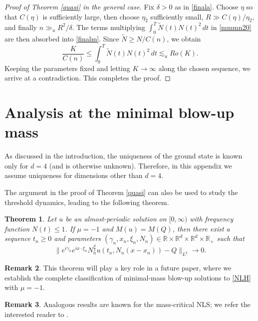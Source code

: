 \documentclass[reqno,11pt]{amsart}
\theoremstyle{plain}
\newtheorem{theorem}{Theorem}
\theoremstyle{definition}
\newtheorem{remark}[theorem]{Remark}
\numberwithin{equation}{section}
\numberwithin{theorem}{section}
\def\geq{\geqslant}
\def\leq{\leqslant}
\begin{document}
\begin{proof}[Proof of Theorem \ref{quasi} in the general case]
Fix $\delta>0$ as in \eqref{finala}. Choose $\eta$ so that $C(\eta)$ is
sufficiently large, then choose $\eta_2$ sufficiently small,
$R\gg C(\eta)/\eta_2$, and finally $n\gg_u R^2/\delta$.
The terms multiplying $\int_0^T\tilde N(t)N(t)^2\,dt$ in \eqref{mmmn20}
are then absorbed into \eqref{finalm}. Since $\tilde N\geq N/C(n)$, we obtain
\begin{equation}\label{finaln}
 \frac{K}{C(n)}\leq\int_0^T\tilde N(t)N(t)^2\,dt
                    \lesssim_u Ro(K).
\end{equation}
Keeping the parameters fixed and letting $K\to\infty$ along the chosen
sequence, we arrive at a contradiction. This completes the proof.
\end{proof}

\appendix 

\section{Analysis at the minimal blow-up mass}\label{app}

As discussed in the introduction, the uniqueness of the ground state is known only for $d=4$ (and is otherwise unknown). 
Therefore, in this appendix we assume uniqueness for dimensions other than $d=4$.

The argument in the proof of Theorem \ref{quasi} can also be used to study the threshold dynamics, 
leading to the following theorem.

\begin{theorem}
Let $u$ be an almost-periodic solution on $[0,\infty)$  with frequency function $N(t)\leq 1$. 
If $\mu=-1$ and $M(u)=M(Q)$, then there exist a sequence $t_n\geq 0$ and parameters 
$(\gamma_n,x_n,\xi_n,N_n)\in\mathbb{R}\times\mathbb{R}^d\times\mathbb{R}^d\times\mathbb{R}_+$ such that
\begin{equation}\label{sequence}
\|e^{i\gamma_n}e^{ix\cdot\xi_n}N_n^{\frac{d}{2}}u(t_n,N_n(x-x_n))-Q\|_{L^2}\to 0.
\end{equation}
\end{theorem}

\begin{remark}
This theorem will play a key role in a future paper, where we establish the complete classification of minimal-mass blow-up solutions to \eqref{NLH} with $\mu=-1$.
\end{remark}

\begin{remark}
Analogous results are known for the mass-critical NLS; we refer the interested reader to \cite{Dodson-SIAM,Dodson-NA,F}.
\end{remark}
\end{document}
